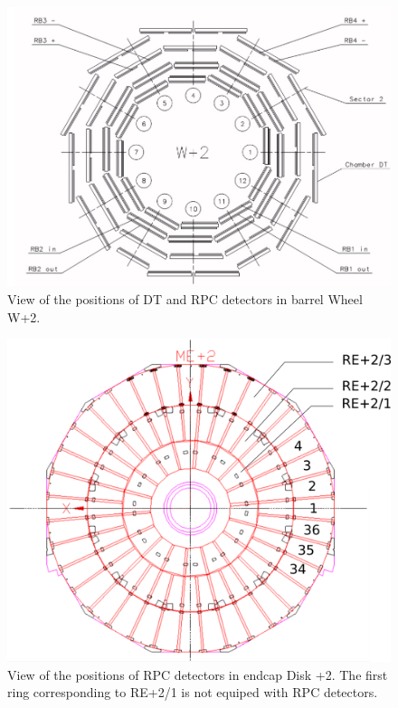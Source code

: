 	\begin{figure}[H]
		\centering
		\includegraphics[width=.9\linewidth]{fig/chapt2/RPC-Wheel.png}
		\caption{\label{fig:RPC-Wheel} View of the positions of DT and RPC detectors in barrel Wheel W+2.}
	\end{figure}
	
	\begin{figure}[H]
		\centering
		\includegraphics[width=.8\linewidth]{fig/chapt2/RPC-endcap.png}
		\caption{\label{fig:RPC-Endcap} View of the positions of RPC detectors in endcap Disk +2. The first ring corresponding to RE+2/1 is not equiped with RPC detectors.}
	\end{figure}


\clearpage{\pagestyle{empty}\cleardoublepage}